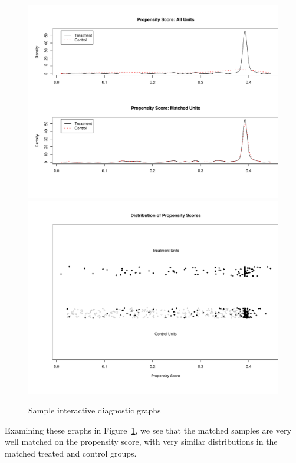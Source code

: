 \documentclass[oneside,letterpaper,titlepage]{article}
\begin{document}
\begin{figure}[ph]
  \begin{center}
     {\includegraphics[scale=0.5]{figs/f2figa}}
     {\includegraphics[scale=0.5]{figs/f2figb}}
    \hfill
    \caption{Sample interactive diagnostic graphs}
    \label{f2diags}
  \end{center}
\end{figure}

Examining these graphs in Figure~\ref{f2diags}, we see that the
matched samples are very well matched on the propensity score, with
very similar distributions in the matched treated and control groups.
\end{document}
